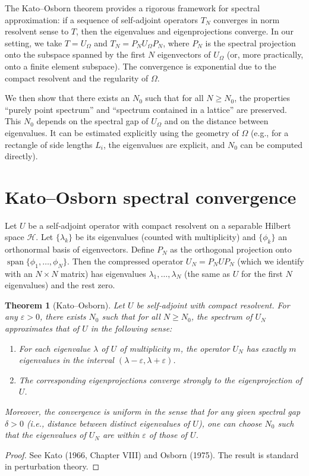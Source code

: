 \documentclass[11pt,a4paper]{article}
\newtheorem{theorem}{Theorem}[section]
\begin{document}
The Kato–Osborn theorem provides a rigorous framework for spectral approximation: if a sequence of self‑adjoint operators $T_N$ converges in norm resolvent sense to $T$, then the eigenvalues and eigenprojections converge. In our setting, we take $T = U_\Omega$ and $T_N = P_N U_\Omega P_N$, where $P_N$ is the spectral projection onto the subspace spanned by the first $N$ eigenvectors of $U_\Omega$ (or, more practically, onto a finite element subspace). The convergence is exponential due to the compact resolvent and the regularity of $\Omega$.

We then show that there exists an $N_0$ such that for all $N \ge N_0$, the properties “purely point spectrum” and “spectrum contained in a lattice” are preserved. This $N_0$ depends on the spectral gap of $U_\Omega$ and on the distance between eigenvalues. It can be estimated explicitly using the geometry of $\Omega$ (e.g., for a rectangle of side lengths $L_i$, the eigenvalues are explicit, and $N_0$ can be computed directly).

\section{Kato–Osborn spectral convergence}

Let $U$ be a self‑adjoint operator with compact resolvent on a separable Hilbert space $\mathcal{H}$. Let $\{\lambda_k\}$ be its eigenvalues (counted with multiplicity) and $\{\phi_k\}$ an orthonormal basis of eigenvectors. Define $P_N$ as the orthogonal projection onto $\operatorname{span}\{\phi_1,\dots,\phi_N\}$. Then the compressed operator $U_N = P_N U P_N$ (which we identify with an $N\times N$ matrix) has eigenvalues $\lambda_1,\dots,\lambda_N$ (the same as $U$ for the first $N$ eigenvalues) and the rest zero.

\begin{theorem}[Kato–Osborn]
Let $U$ be self‑adjoint with compact resolvent. For any $\varepsilon > 0$, there exists $N_0$ such that for all $N \ge N_0$, the spectrum of $U_N$ approximates that of $U$ in the following sense:
\begin{enumerate}
\item For each eigenvalue $\lambda$ of $U$ of multiplicity $m$, the operator $U_N$ has exactly $m$ eigenvalues in the interval $(\lambda - \varepsilon, \lambda + \varepsilon)$.
\item The corresponding eigenprojections converge strongly to the eigenprojection of $U$.
\end{enumerate}
Moreover, the convergence is uniform in the sense that for any given spectral gap $\delta > 0$ (i.e., distance between distinct eigenvalues of $U$), one can choose $N_0$ such that the eigenvalues of $U_N$ are within $\varepsilon$ of those of $U$.
\end{theorem}
\begin{proof}
See Kato (1966, Chapter VIII) and Osborn (1975). The result is standard in perturbation theory.
\end{proof}
\end{document}
